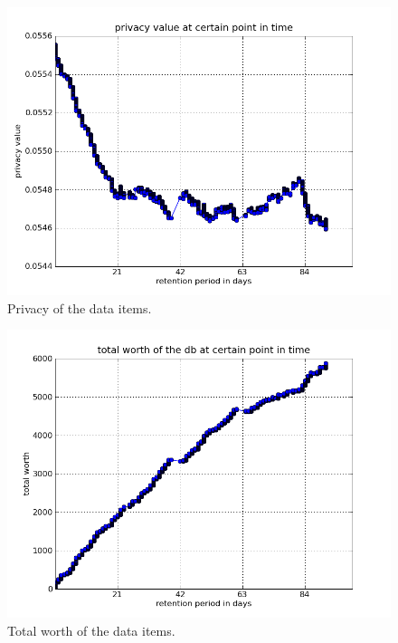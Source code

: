 \documentclass[a4paper,12pt,oneside,fleqn]{article}
\newcommand{\flabel}[1]{\label{fig:#1}}
\begin{document}
\begin{figure}[h]
\includegraphics[width=\linewidth]{img/privacies.png}
\caption{Privacy of the data items.}
\flabel{privacies}
\end{figure}

\begin{figure}[h]
\includegraphics[width=\linewidth]{img/tot_worths.png}
\caption{Total worth of the data items.}
\flabel{totworths}
\end{figure}
\end{document}
